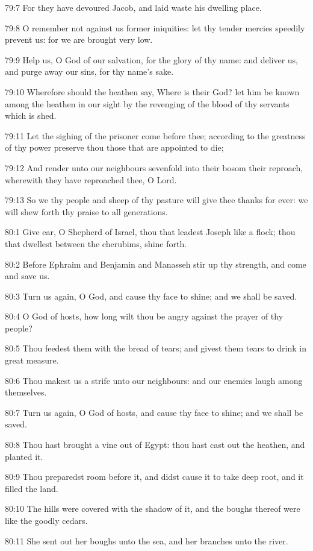 79:7 For they have devoured Jacob, and laid waste his dwelling place.

79:8 O remember not against us former iniquities: let thy tender
mercies speedily prevent us: for we are brought very low.

79:9 Help us, O God of our salvation, for the glory of thy name: and
deliver us, and purge away our sins, for thy name's sake.

79:10 Wherefore should the heathen say, Where is their God? let him be
known among the heathen in our sight by the revenging of the blood of
thy servants which is shed.

79:11 Let the sighing of the prisoner come before thee; according to
the greatness of thy power preserve thou those that are appointed to
die;

79:12 And render unto our neighbours sevenfold into their bosom their
reproach, wherewith they have reproached thee, O Lord.

79:13 So we thy people and sheep of thy pasture will give thee thanks
for ever: we will shew forth thy praise to all generations.



80:1 Give ear, O Shepherd of Israel, thou that leadest Joseph like a
flock; thou that dwellest between the cherubims, shine forth.

80:2 Before Ephraim and Benjamin and Manasseh stir up thy strength,
and come and save us.

80:3 Turn us again, O God, and cause thy face to shine; and we shall
be saved.

80:4 O \LORD God of hosts, how long wilt thou be angry against the
prayer of thy people?

80:5 Thou feedest them with the bread of tears; and givest them tears
to drink in great measure.

80:6 Thou makest us a strife unto our neighbours: and our enemies
laugh among themselves.

80:7 Turn us again, O God of hosts, and cause thy face to shine; and
we shall be saved.

80:8 Thou hast brought a vine out of Egypt: thou hast cast out the
heathen, and planted it.

80:9 Thou preparedst room before it, and didst cause it to take deep
root, and it filled the land.

80:10 The hills were covered with the shadow of it, and the boughs
thereof were like the goodly cedars.

80:11 She sent out her boughs unto the sea, and her branches unto the
river.

